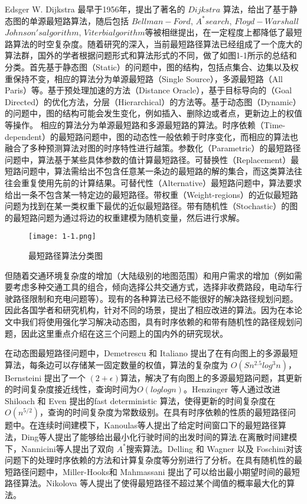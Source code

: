 \documentclass{standalone}
\begin{document}
Edsger W. Dijkstra 最早于1956年，提出了著名的 $Dijkstra$ 算法，给出了基于静态图的单源最短路算法，随后包括 $Bellman-Ford$, $A^* search$, $Floyd-Warshall$ $Johnson's algorithm$, $Viterbi algorithm$等被相继提出，在一定程度上都降低了最短路算法的时空复杂度。随着研究的深入，当前最短路径算法已经组成了一个庞大的算法群，国外的学者根据问题形式和算法形式的不同，做了如图1-1所示的总结和分类。首先基于静态图（Static）的问题中，图的结构，包括点集合、边集以及权重保持不变，相应的算法分为单源最短路（Single Source），多源最短路（All Paris）等。基于预处理加速的方法（Distance Oracle），基于目标导向的（Goal Directed）的优化方法，分层（Hierarchical）的方法等。基于动态图（Dynamic）的问题中，图的结构可能会发生变化，例如插入、删除边或者点，更新边上的权值等操作。 相应的算法分为单源最短路和多源最短路的算法。时序依赖（Time-dependent）的最短路问题中，图的动态性一般依赖于时序变化，而相应的算法也融合了多种预测算法对图的时序特性进行越策。参数化（Parametric）的最短路径问题中，算法基于某些具体参数的值计算最短路径。可替换性（Replacement）最短路问题中，算法需给出不包含任意某一条边的最短路的解的集合，而这类算法往往会重复使用先前的计算结果。可替代性（Alternative）最短路问题中，算法要求给出一条不包含某一特定边的最短路径。带权重（Weight-regions）的近似最短路问题为找到在某一类权重下最优的近似最短路径。带有随机性（Stochastic）的图的最短路问题为通过将边的权重建模为随机变量，然后进行求解。\par
\begin{figure}[h]
	\texttt{[image: 1-1.png]}
	\caption{最短路径算法分类图}
	\label{1-1}
\end{figure}

但随着交通环境复杂度的增加（大陆级别的地图范围）和用户需求的增加（例如需要考虑多种交通工具的组合，倾向选择公共交通方式，选择非收费路段，电动车行驶路径限制和充电问题等）。现有的各种算法已经不能很好的解决路径规划问题。因此各国学者和研究机构，针对不同的场景，提出了相应改进的算法。因为在本论文中我们将使用强化学习解决动态图，具有时序依赖的和带有随机性的路径规划问题，因此这里重点介绍在这三个问题上的国内外的研究现状。\par

在动态图最短路径问题中，Demetrescu 和 Italiano 提出了在有向图上的多源最短算法，每条边可以存储某一固定数量的权值，算法的复杂度为 $O(Sn^{2.5}log^3n)$，Bernsteini 提出了一个 $(2+\epsilon)$算法，解决了有向图上的多源最短路问题，其更新的时间复杂度接近线性，查询时间为$O(loglogn)$。Henzinger 等人通过改进 Shiloach 和 Even 提出的fast deterministic 算法，使得更新的时间复杂度在$O(n^{5/2})$，查询的时间复杂度为常数级别。在具有时序依赖的性质的最短路径问题中。在连续时间建模下，Kanoulas等人提出了给定时间窗口下的最短路径算法，Ding等人提出了能够给出最小化行驶时间的出发时间的算法.在离散时间建模下，Nannicini等人提出了双向 $A^*$搜索算法。Delling 和 Wagner 以及 Foschini对该问题下的处理时序依赖的方法和计算复杂度等分别进行了分析。在具有随机性的最短路径问题中，Miller-Hooks和 Mahmassani 提出了可以给出最小期望时间的最短路径算法。Nikolova 等人提出了使得最短路径不超过某个阈值的概率最大化的算法。
\end{document}

